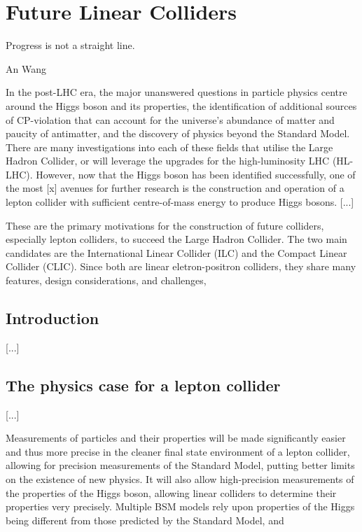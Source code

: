 \chapter{Future Linear Colliders}
\label{chapter:colliders}

\epigraph{Progress is not a straight line.}{An Wang}

In the post-LHC era, the major unanswered questions in particle physics centre around the Higgs boson and its properties, the identification of additional sources of CP-violation that can account for the universe's abundance of matter and paucity of antimatter, and the discovery of physics beyond the Standard Model. There are many investigations into each of these fields that utilise the Large Hadron Collider, or will leverage the upgrades for the high-luminosity LHC (HL-LHC). However, now that the Higgs boson has been identified successfully, one of the most [x] avenues for further research is the construction and operation of a lepton collider with sufficient centre-of-mass energy to produce Higgs bosons. [...]

These are the primary motivations for the construction of future colliders, especially lepton colliders, to succeed the Large Hadron Collider. The two main candidates are the International Linear Collider (ILC) and  the Compact Linear Collider (CLIC). Since both are linear eletron-positron colliders, they share many features, design considerations, and challenges, 

\section{Introduction}
[...]

\section{The physics case for a lepton collider}
[...]

Measurements of particles and their properties will be made significantly easier and thus more precise in the cleaner final state environment of a lepton collider, allowing for precision measurements of the Standard Model, putting better limits on the existence of new physics. It will also allow high-precision measurements of the properties of the Higgs boson, allowing linear colliders to determine their properties very precisely. Multiple BSM models rely upon properties of the Higgs being different from those predicted by the Standard Model, and 

